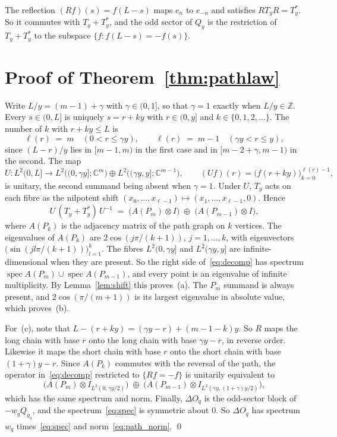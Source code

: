 \documentclass[11pt,a4paper]{article}
\theoremstyle{plain}
\theoremstyle{definition}
\theoremstyle{remark}
\newcommand{\C}{\mathbb{C}}
\newcommand{\Z}{\mathbb{Z}}
\newcommand{\spec}{\operatorname{spec}}
\begin{document}
The reflection $(Rf)(s) = f(L - s)$ maps $e_n$ to $e_{-n}$ and satisfies $R T_y R = T_y^{*}$. So it commutes with $T_y + T_y^{*}$, and the odd sector of $Q_y$ is the restriction of $T_y + T_y^{*}$ to the subspace $\{f : f(L-s) = -f(s)\}$.

\section{Proof of Theorem~\ref{thm:pathlaw}}\label{sec:proof}

Write $L/y = (m - 1) + \gamma$ with $\gamma \in (0, 1]$, so that $\gamma = 1$ exactly when $L/y \in \Z$. Every $s \in (0, L]$ is uniquely $s = r + ky$ with $r \in (0, y]$ and $k \in \{0, 1, 2, \dots\}$. The number of $k$ with $r + ky \le L$ is
\[
  \ell(r) \;=\; m \quad (0 < r \le \gamma y), \qquad \ell(r) \;=\; m - 1 \quad (\gamma y < r \le y),
\]
since $(L - r)/y$ lies in $[m-1, m)$ in the first case and in $[m - 2 + \gamma, m - 1)$ in the second. The map
\[
  U : L^2(0, L] \longrightarrow L^2\bigl((0, \gamma y]; \C^{m}\bigr) \oplus L^2\bigl((\gamma y, y]; \C^{m-1}\bigr), \qquad (Uf)(r) = \bigl(f(r + ky)\bigr)_{k=0}^{\ell(r)-1},
\]
is unitary, the second summand being absent when $\gamma = 1$. Under $U$, $T_y$ acts on each fibre as the nilpotent shift $(x_0, \dots, x_{\ell-1}) \mapsto (x_1, \dots, x_{\ell-1}, 0)$. Hence
\begin{equation}\label{eq:decomp}
  U\,(T_y + T_y^{*})\,U^{-1} \;=\; \bigl(A(P_m) \otimes I\bigr) \;\oplus\; \bigl(A(P_{m-1}) \otimes I\bigr),
\end{equation}
where $A(P_k)$ is the adjacency matrix of the path graph on $k$ vertices. The eigenvalues of $A(P_k)$ are $2\cos(j\pi/(k+1))$, $j = 1, \dots, k$, with eigenvectors $\bigl(\sin(jl\pi/(k+1))\bigr)_{l=1}^{k}$. The fibres $L^2(0, \gamma y]$ and $L^2(\gamma y, y]$ are infinite-dimensional when they are present. So the right side of~\eqref{eq:decomp} has spectrum $\spec A(P_m) \cup \spec A(P_{m-1})$, and every point is an eigenvalue of infinite multiplicity. By Lemma~\ref{lem:shift} this proves~(a). The $P_m$ summand is always present, and $2\cos(\pi/(m+1))$ is its largest eigenvalue in absolute value, which proves~(b).

For~(c), note that $L - (r + ky) = (\gamma y - r) + (m - 1 - k)y$. So $R$ maps the long chain with base $r$ onto the long chain with base $\gamma y - r$, in reverse order. Likewise it maps the short chain with base $r$ onto the short chain with base $(1 + \gamma)y - r$. Since $A(P_k)$ commutes with the reversal of the path, the operator in~\eqref{eq:decomp} restricted to $\{Rf = -f\}$ is unitarily equivalent to
\[
  \bigl(A(P_m) \otimes I_{L^2(0, \gamma y/2)}\bigr) \;\oplus\; \bigl(A(P_{m-1}) \otimes I_{L^2(\gamma y, (1+\gamma) y/2)}\bigr),
\]
which has the same spectrum and norm. Finally, $\Delta O_q$ is the odd-sector block of $-w_q Q_{y_q}$, and the spectrum~\eqref{eq:spec} is symmetric about $0$. So $\Delta O_q$ has spectrum $w_q$ times~\eqref{eq:spec} and norm~\eqref{eq:path_norm}. \qed
\end{document}
